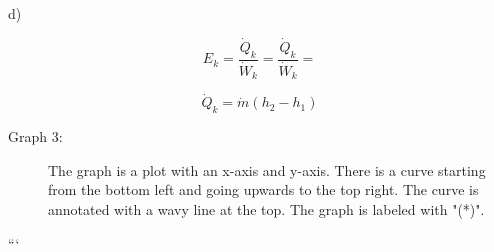 d)

\[
E_k = \frac{\dot{Q}_k}{\dot{W}_k} = \frac{\dot{Q}_k}{\dot{W}_k} =
\]

\[
\dot{Q}_k = \dot{m} (h_2 - h_1)
\]

\begin{description}
    \item[Graph 3:] The graph is a plot with an x-axis and y-axis. There is a curve starting from the bottom left and going upwards to the top right. The curve is annotated with a wavy line at the top. The graph is labeled with "(*)".
\end{description}

```